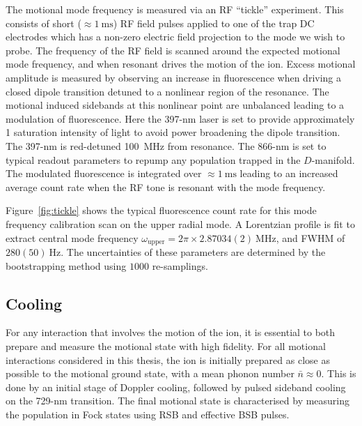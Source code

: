     The motional mode frequency is measured via an RF ``tickle'' experiment.
    This consists of short ($\approx 1~\unit{\milli\second}$) RF field pulses applied to one
    of the trap DC electrodes which has a non-zero electric field projection to
    the mode we wish to probe. The frequency of the RF field is scanned around
    the expected motional mode frequency, and when resonant drives the motion
    of the ion. Excess motional amplitude is measured by observing an increase in
    fluorescence when driving a closed dipole transition detuned to a nonlinear
    region of the resonance. The motional induced sidebands at this nonlinear
    point are unbalanced leading to a modulation of fluorescence. Here the
    397-nm laser is set to provide approximately 1 saturation intensity of light
    to avoid power broadening the dipole transition. The 397-nm is red-detuned
    100~\unit{\MHz} from resonance.  The 866-nm is set to typical readout parameters to
    repump any population trapped in the $D$-manifold. The modulated
    fluorescence is integrated over $\approx 1~\unit{\milli\second}$ leading to
    an increased average count rate when the RF tone is resonant with the mode
    frequency.

    Figure~\ref{fig:tickle} shows the typical fluorescence count rate for this mode frequency calibration scan on the upper radial mode. A Lorentzian profile is fit to extract central mode frequency $\omega_\mathrm{upper}=2\pi\times2.87034(2)~\unit{\mega\hertz}$, and FWHM of $280(50)~\unit{\hertz}$. The uncertainties of these parameters are determined by the bootstrapping method using $1000$ re-samplings.

\subsection{Cooling}
\label{sec:Cooling}

    For any interaction that involves the motion of the ion, it is essential to
    both prepare and measure the motional state with high fidelity. For all
    motional interactions considered in this thesis, the ion is initially
    prepared as close as possible to the motional ground state, with a mean
    phonon number $\bar{n} \approx 0$. This is done by an initial stage of
    Doppler cooling, followed by pulsed sideband cooling on the 729-nm
    transition. The final motional state is characterised by measuring the
    population in Fock states using RSB and effective BSB pulses.


